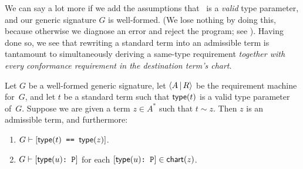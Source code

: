\documentclass[../generics]{subfiles}
\begin{document}
We can say a lot more if we add the assumptions that \tT\ is a \emph{valid} type parameter, and our generic signature $G$ is well-formed. (We lose nothing by doing this, because otherwise we diagnose an error and reject the program; see ). Having done so, we see that rewriting a standard term into an admissible term is tantamount to simultaneously deriving a same-type requirement \textsl{together with every conformance requirement in the destination term's chart}.

\begin{theorem}\label{type chart theorem}
Let $G$ be a well-formed generic signature, let $\langle A\,|\,R\rangle$ be the requirement machine for~$G$, and let $t$ be a standard term such that $\mathsf{type}(t)$ is a valid type parameter of~$G$. Suppose we are given a term $z\in A^*$ such that $t \sim z$. Then $z$ is an admissible term, and furthermore:
\begin{enumerate}
\item $G \vdash [\texttt{$\mathsf{type}(t)$ == $\mathsf{type}(z)$}]$.
\item $G \vdash [\texttt{$\mathsf{type}(u)$:~P}]$ for each $[\texttt{$\mathsf{type}(u)$:~P}]\in\mathsf{chart}(z)$.
\end{enumerate}
\end{theorem}

\newcommand{\Case}[1]{\smallskip\par($\bigstar$ Case #1.)}
\end{document}
